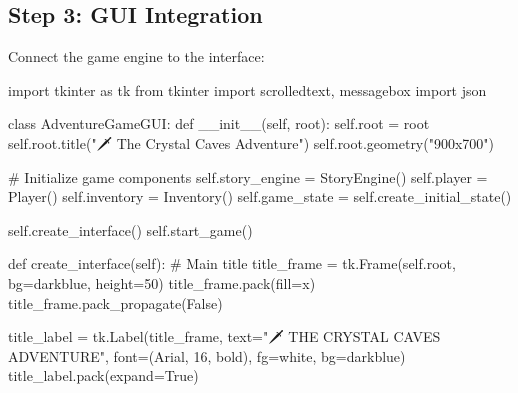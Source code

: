 \documentclass[
  letterpaper,
  DIV=11,
  numbers=noendperiod,
  oneside]{scrreprt}
\newenvironment{Shaded}{}{}
\newcommand{\CommentTok}[1]{\textcolor[rgb]{0.42,0.45,0.49}{#1}}
\newcommand{\DecValTok}[1]{\textcolor[rgb]{0.00,0.36,0.77}{#1}}
\newcommand{\FunctionTok}[1]{\textcolor[rgb]{0.44,0.26,0.76}{#1}}
\newcommand{\ImportTok}[1]{\textcolor[rgb]{0.01,0.18,0.38}{#1}}
\newcommand{\KeywordTok}[1]{\textcolor[rgb]{0.84,0.23,0.29}{#1}}
\newcommand{\NormalTok}[1]{\textcolor[rgb]{0.14,0.16,0.18}{#1}}
\newcommand{\OperatorTok}[1]{\textcolor[rgb]{0.14,0.16,0.18}{#1}}
\newcommand{\StringTok}[1]{\textcolor[rgb]{0.01,0.18,0.38}{#1}}
\newcommand{\VariableTok}[1]{\textcolor[rgb]{0.89,0.38,0.04}{#1}}
\begin{document}
\subsection{Step 3: GUI Integration}\label{step-3-gui-integration}

Connect the game engine to the interface:

\begin{Shaded}
\begin{Highlighting}[]
\ImportTok{import}\NormalTok{ tkinter }\ImportTok{as}\NormalTok{ tk}
\ImportTok{from}\NormalTok{ tkinter }\ImportTok{import}\NormalTok{ scrolledtext, messagebox}
\ImportTok{import}\NormalTok{ json}

\KeywordTok{class}\NormalTok{ AdventureGameGUI:}
    \KeywordTok{def} \FunctionTok{\_\_init\_\_}\NormalTok{(}\VariableTok{self}\NormalTok{, root):}
        \VariableTok{self}\NormalTok{.root }\OperatorTok{=}\NormalTok{ root}
        \VariableTok{self}\NormalTok{.root.title(}\StringTok{"🗡️ The Crystal Caves Adventure"}\NormalTok{)}
        \VariableTok{self}\NormalTok{.root.geometry(}\StringTok{"900x700"}\NormalTok{)}
        
        \CommentTok{\# Initialize game components}
        \VariableTok{self}\NormalTok{.story\_engine }\OperatorTok{=}\NormalTok{ StoryEngine()}
        \VariableTok{self}\NormalTok{.player }\OperatorTok{=}\NormalTok{ Player()}
        \VariableTok{self}\NormalTok{.inventory }\OperatorTok{=}\NormalTok{ Inventory()}
        \VariableTok{self}\NormalTok{.game\_state }\OperatorTok{=} \VariableTok{self}\NormalTok{.create\_initial\_state()}
        
        \VariableTok{self}\NormalTok{.create\_interface()}
        \VariableTok{self}\NormalTok{.start\_game()}
    
    \KeywordTok{def}\NormalTok{ create\_interface(}\VariableTok{self}\NormalTok{):}
        \CommentTok{\# Main title}
\NormalTok{        title\_frame }\OperatorTok{=}\NormalTok{ tk.Frame(}\VariableTok{self}\NormalTok{.root, bg}\OperatorTok{=}\StringTok{\textquotesingle{}darkblue\textquotesingle{}}\NormalTok{, height}\OperatorTok{=}\DecValTok{50}\NormalTok{)}
\NormalTok{        title\_frame.pack(fill}\OperatorTok{=}\StringTok{\textquotesingle{}x\textquotesingle{}}\NormalTok{)}
\NormalTok{        title\_frame.pack\_propagate(}\VariableTok{False}\NormalTok{)}
        
\NormalTok{        title\_label }\OperatorTok{=}\NormalTok{ tk.Label(title\_frame, text}\OperatorTok{=}\StringTok{"🗡️ THE CRYSTAL CAVES ADVENTURE"}\NormalTok{, }
\NormalTok{                              font}\OperatorTok{=}\NormalTok{(}\StringTok{\textquotesingle{}Arial\textquotesingle{}}\NormalTok{, }\DecValTok{16}\NormalTok{, }\StringTok{\textquotesingle{}bold\textquotesingle{}}\NormalTok{), fg}\OperatorTok{=}\StringTok{\textquotesingle{}white\textquotesingle{}}\NormalTok{, bg}\OperatorTok{=}\StringTok{\textquotesingle{}darkblue\textquotesingle{}}\NormalTok{)}
\NormalTok{        title\_label.pack(expand}\OperatorTok{=}\VariableTok{True}\NormalTok{)}
        

\end{Highlighting}
\end{Shaded}
\end{document}
